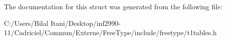 The documentation for this struct was generated from the following file\+:\begin{DoxyCompactItemize}
\item 
C\+:/\+Users/\+Bilal Itani/\+Desktop/inf2990-\/11/\+Cadriciel/\+Commun/\+Externe/\+Free\+Type/include/freetype/t1tables.\+h\end{DoxyCompactItemize}
